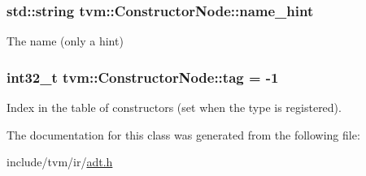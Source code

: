 \subsubsection[{\texorpdfstring{name\+\_\+hint}{name_hint}}]{\setlength{\rightskip}{0pt plus 5cm}std\+::string tvm\+::\+Constructor\+Node\+::name\+\_\+hint}\hypertarget{classtvm_1_1ConstructorNode_a4bc169a07961c92da7ee35a5cebdf209}{}\label{classtvm_1_1ConstructorNode_a4bc169a07961c92da7ee35a5cebdf209}


The name (only a hint) 

\subsubsection[{\texorpdfstring{tag}{tag}}]{\setlength{\rightskip}{0pt plus 5cm}int32\+\_\+t tvm\+::\+Constructor\+Node\+::tag = -\/1\hspace{0.3cm}{\ttfamily [mutable]}}\hypertarget{classtvm_1_1ConstructorNode_a396a76459b3a46eefdfcd952c69c5ee4}{}\label{classtvm_1_1ConstructorNode_a396a76459b3a46eefdfcd952c69c5ee4}


Index in the table of constructors (set when the type is registered). 



The documentation for this class was generated from the following file\+:\begin{DoxyCompactItemize}
\item 
include/tvm/ir/\hyperlink{ir_2adt_8h}{adt.\+h}\end{DoxyCompactItemize}
